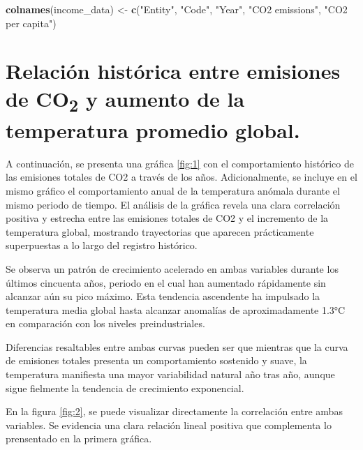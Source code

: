 \documentclass[
]{book}
\newenvironment{Shaded}{\begin{snugshade}}{\end{snugshade}}
\newcommand{\FunctionTok}[1]{\textcolor[rgb]{0.13,0.29,0.53}{\textbf{#1}}}
\newcommand{\NormalTok}[1]{#1}
\newcommand{\OtherTok}[1]{\textcolor[rgb]{0.56,0.35,0.01}{#1}}
\newcommand{\StringTok}[1]{\textcolor[rgb]{0.31,0.60,0.02}{#1}}
\begin{document}
\begin{Shaded}
\begin{Highlighting}[]
\FunctionTok{colnames}\NormalTok{(income\_data) }\OtherTok{\textless{}{-}} \FunctionTok{c}\NormalTok{(}\StringTok{"Entity"}\NormalTok{, }\StringTok{"Code"}\NormalTok{, }\StringTok{"Year"}\NormalTok{, }\StringTok{"CO2 emissions"}\NormalTok{, }\StringTok{"CO2 per capita"}\NormalTok{)}
\end{Highlighting}
\end{Shaded}

\section{\texorpdfstring{Relación histórica entre emisiones de CO\textsubscript{2} y aumento de la temperatura promedio global.}{Relación histórica entre emisiones de CO2 y aumento de la temperatura promedio global.}}\label{relaciuxf3n-histuxf3rica-entre-emisiones-de-co2-y-aumento-de-la-temperatura-promedio-global.}

A continuación, se presenta una gráfica \ref{fig:1} con el comportamiento histórico de las emisiones totales de CO2 a través de los años. Adicionalmente, se incluye en el mismo gráfico el comportamiento anual de la temperatura anómala durante el mismo periodo de tiempo. El análisis de la gráfica revela una clara correlación positiva y estrecha entre las emisiones totales de CO2 y el incremento de la temperatura global, mostrando trayectorias que aparecen prácticamente superpuestas a lo largo del registro histórico.

Se observa un patrón de crecimiento acelerado en ambas variables durante los últimos cincuenta años, periodo en el cual han aumentado rápidamente sin alcanzar aún su pico máximo. Esta tendencia ascendente ha impulsado la temperatura media global hasta alcanzar anomalías de aproximadamente 1.3°C en comparación con los niveles preindustriales.

Diferencias resaltables entre ambas curvas pueden ser que mientras que la curva de emisiones totales presenta un comportamiento sostenido y suave, la temperatura manifiesta una mayor variabilidad natural año tras año, aunque sigue fielmente la tendencia de crecimiento exponencial.

En la figura \ref{fig:2}, se puede visualizar directamente la correlación entre ambas variables. Se evidencia una clara relación lineal positiva que complementa lo prensentado en la primera gráfica.
\end{document}
